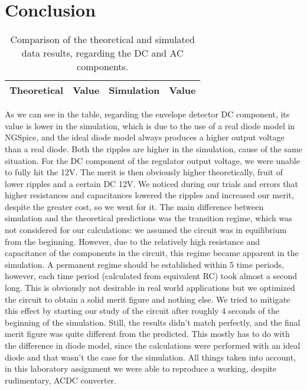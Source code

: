 \newpage
\section{Conclusion}
\label{sec:conclusion}
\begin{table}[!h]
  \centering
  \begin{tabular}{c c c c}
    \hline    
    {\bf Theoretical} & {\bf Value} & {\bf Simulation} & {\bf Value}\\ \hline
     
  \end{tabular}
  \caption{Comparison of the theoretical and simulated data results, regarding the DC and AC components.}
  \label{tab:comp}
\end{table}
As we can see in the table, regarding the envelope detector DC component, its value is lower in the simulation, which is due to the use of a real diode model in NGSpice, and the ideal diode model always produces a higher output voltage than a real diode. Both the ripples are higher in the simulation, cause of the same situation. For the DC component of the regulator output voltage, we were unable to fully hit the 12V. The merit is then obviously higher theoretically, fruit of lower ripples and a certain DC 12V. We noticed during our trials and errors that higher resistances and capacitances lowered the ripples and increased our merit, despite the greater cost, so we went for it.
The main difference between simulation and the theoretical predictions was the transition regime, which was not considered for our calculations: we assumed the circuit was in equilibrium from the beginning. However, due to the relatively high resistance and capacitance of the components in the circuit, this regime became apparent in the simulation. A permanent regime should be established within 5 time periods, however, each time period (calculated from equivalent RC) took almost a second long. This is obviously not desirable in real world applications but we optimized the circuit to obtain a solid merit figure and nothing else.
We tried to mitigate this effect by starting our study of the circuit after roughly 4 seconds of the beginning of the simulation. Still, the results didn't match perfectly, and the final merit figure was quite different from the predicted. This mostly has to do with the difference in diode model, since the calculations were performed with an ideal diode and that wasn't the case for the simulation.
All things taken into account, in this laboratory assignment we were able to reproduce a working, despite rudimentary, ACDC converter. 
